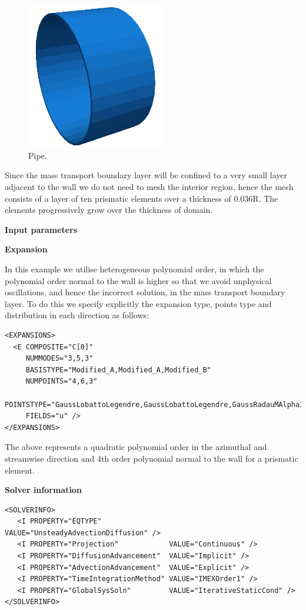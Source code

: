 \begin{figure}[h!]
\begin{center}
\includegraphics[width=6cm]{Figures/pipe}
\caption{Pipe.}
\end{center}
\end{figure}

Since the mass transport boundary layer will be confined to a very small layer adjacent to the wall we do not need to mesh
 the interior region, hence the mesh consists of a layer of ten prismatic elements over a thickness of 0.036R. 
The elements progressively grow over the thickness of domain.

\textbf{Input parameters}

\textbf{\footnotesize{Expansion}}

In this example we utilise heterogeneous polynomial order, in which the polynomial order normal to the wall is
 higher so that we avoid unphysical oscillations, and hence the incorrect solution, in the mass transport boundary layer.
  To do this we specify explicitly the expansion type, points type and distribution in each direction as follows:

\begin{lstlisting}[style=XMLStyle]
<EXPANSIONS>
  <E COMPOSITE="C[0]"
     NUMMODES="3,5,3"
     BASISTYPE="Modified_A,Modified_A,Modified_B"
     NUMPOINTS="4,6,3"
     POINTSTYPE="GaussLobattoLegendre,GaussLobattoLegendre,GaussRadauMAlpha1Beta0"
     FIELDS="u" />
</EXPANSIONS>
\end{lstlisting}

The above represents a quadratic polynomial order in the azimuthal and streamwise direction and 
4th order polynomial normal to the wall for a prismatic element.

\textbf{\footnotesize{Solver information}}

\begin{lstlisting}[style=XMLStyle]
<SOLVERINFO>
   <I PROPERTY="EQTYPE"                VALUE="UnsteadyAdvectionDiffusion" />
   <I PROPERTY="Projection"            VALUE="Continuous" />
   <I PROPERTY="DiffusionAdvancement"  VALUE="Implicit" />
   <I PROPERTY="AdvectionAdvancement"  VALUE="Explicit" />
   <I PROPERTY="TimeIntegrationMethod" VALUE="IMEXOrder1" />
   <I PROPERTY="GlobalSysSoln"         VALUE="IterativeStaticCond" />
</SOLVERINFO>
\end{lstlisting}

